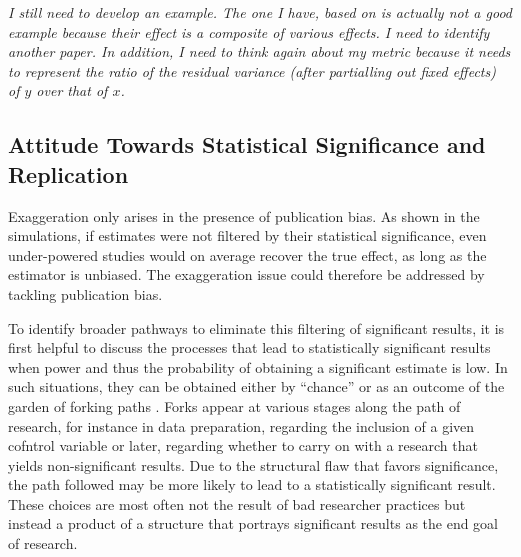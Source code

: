 \documentclass[usletter, 12pt]{article}
\begin{document}
				\textit{I still need to develop an example. The one I have, based on \cite{deschenes_economic_2007} is actually not a good example because their effect is a composite of various effects. I need to identify another paper. In addition, I need to think again about my metric because it needs to represent the ratio of the residual variance (after partialling out fixed effects) of $y$ over that of $x$.}
				
				
				
	\subsection{Attitude Towards Statistical Significance and Replication}
	
		Exaggeration only arises in the presence of publication bias. As shown in the simulations, if estimates were not filtered by their statistical significance, even under-powered studies would on average recover the true effect, as long as the estimator is unbiased. The exaggeration issue could therefore be addressed by tackling publication bias. 
		
		To identify broader pathways to eliminate this filtering of significant results, it is first helpful to discuss the processes that lead to statistically significant results when power and thus the probability of obtaining a significant estimate is low. In such situations, they can be obtained either by ``chance'' or as an outcome of the garden of forking paths \citep{simmons_false-positive_2011, gelman_garden_2013, kasy_forking_2021}. Forks appear at various stages along the path of research, for instance in data preparation, regarding the inclusion of a given cofntrol variable or later, regarding whether to carry on with a research that yields non-significant results. Due to the structural flaw that favors significance, the path followed may be more likely to lead to a statistically significant result. These choices are most often not the result of bad researcher practices but instead a product of a structure that portrays significant results as the end goal of research. 
		
\end{document}
